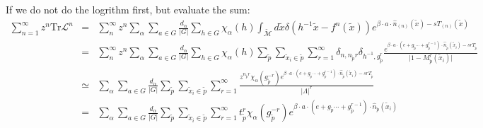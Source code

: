 \begin{description}
If we do not do the logrithm first, but evaluate the sum:
\begin{eqnarray*}
\sum_{n=1}^{\infty}z^{n}\mathrm{Tr}\mathcal{L}^{n} & = & \sum_{n}^{\infty}z^{n}\sum_{\alpha}\sum_{a\in G}\frac{d_{\alpha}}{\vert G\vert}\sum_{h\in G}\chi_{\alpha}(h)\int_{\mathcal{\tilde{\mathcal{M}}}}d\tilde{x}\delta(h^{-1}\tilde{x}-f^{n}(\tilde{x}))e^{\beta\cdot a\cdot\hat{n}_{(n)}(\tilde{x})-sT_{(n)}(\tilde{x})}\\
 & = & \sum_{n}^{\infty}z^{n}\sum_{\alpha}\sum_{a\in G}\frac{d_{\alpha}}{\vert G\vert}\sum_{h\in G}\chi_{\alpha}(h)\sum_{\tilde{p}}\sum_{\tilde{x}_{i}\in\tilde{p}}\sum_{r=1}^{\infty}\delta_{n,n_{\tilde{p}}r}\delta_{h^{-1},g_{\tilde{p}}^{r}}\frac{e^{\beta\cdot a\cdot(e+g_{\tilde{p}}\cdots+g_{\tilde{p}}^{r-1})\cdot\hat{n}_{\tilde{p}}(\tilde{x}_{i})-srT_{\tilde{p}}}}{\vert1-M_{\tilde{p}}^{r}(\tilde{x}_{i})\vert}\\
 & \simeq & \sum_{\alpha}\sum_{a\in G}\frac{d_{\alpha}}{\vert G\vert}\sum_{\tilde{p}}\sum_{\tilde{x}_{i}\in\tilde{p}}\sum_{r=1}^{\infty}\frac{z^{n_{\tilde{p}}r}\chi_{\alpha}(g_{\tilde{p}}^{-r})e^{\beta\cdot a\cdot(e+g_{\tilde{p}}\cdots+g_{\tilde{p}}^{r-1})\cdot\hat{n}_{\tilde{p}}(\tilde{x}_{i})-srT_{\tilde{p}}}}{\vert\Lambda\vert^{r}}\\
 & = & \sum_{\alpha}\sum_{a\in G}\frac{d_{\alpha}}{\vert G\vert}\sum_{\tilde{p}}\sum_{\tilde{x}_{i}\in\tilde{p}}\sum_{r=1}^{\infty}t_{\tilde{p}}^{r}\chi_{\alpha}(g_{\tilde{p}}^{-r})e^{\beta\cdot a\cdot(e+g_{\tilde{p}}\cdots+g_{\tilde{p}}^{r-1})\cdot\hat{n}_{\tilde{p}}(\tilde{x}_{i})}
\end{eqnarray*}



\end{description}

